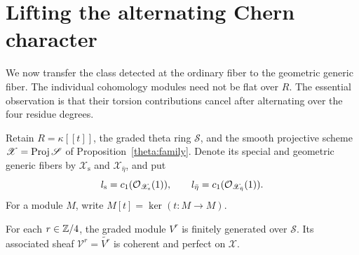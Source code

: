 \section{Lifting the alternating Chern character}
\label{lift:section}

We now transfer the class detected at the ordinary fiber to the geometric
generic fiber.  The individual cohomology modules need not be flat over
$R$.  The essential observation is that their torsion contributions
cancel after alternating over the four residue degrees.

Retain $R=\kappa[[t]]$, the graded theta ring $\mathscr S$, and the smooth
projective scheme $\mathscr X=\operatorname{Proj}\mathscr S$ of
Proposition~\ref{theta:family}.  Denote its special and geometric generic
fibers by $\mathscr X_{\mathrm s}$ and $\mathscr X_{\bar\eta}$,
and put
\[
 l_{\mathrm s}=c_1(\mathcal O_{\mathscr X_{\mathrm s}}(1)),\qquad
 l_{\bar\eta}=c_1(\mathcal O_{\mathscr X_{\bar\eta}}(1)).
\]
For a module $M$, write $M[t]=\ker(t:M\to M)$.

\begin{lemma}
\label{lift:finite-generation}
For each $r\in\mathbb Z/4$, the graded module $V^r$ is finitely generated over
$\mathscr S$.  Its associated sheaf $\mathcal V^r=\widetilde{V^r}$ is
coherent and perfect on $\mathscr X$.
\end{lemma}

